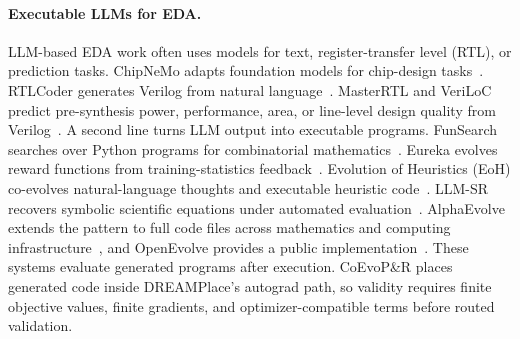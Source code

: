 \paragraph{Executable LLMs for EDA.}
LLM-based EDA work often uses models for text, register-transfer level (RTL),
or prediction tasks. ChipNeMo adapts foundation models for chip-design
tasks~\cite{chipnemo}. RTLCoder generates Verilog from natural
language~\cite{rtlcoder}. MasterRTL and VeriLoC predict pre-synthesis power,
performance, area, or line-level design quality from
Verilog~\cite{masterrtl,veriloc}. A second line turns LLM output into
executable programs. FunSearch searches over Python programs for
combinatorial mathematics~\cite{funsearch}. Eureka evolves reward functions
from training-statistics feedback~\cite{eureka}. Evolution of Heuristics
(EoH) co-evolves natural-language thoughts and executable heuristic
code~\cite{eoh}. LLM-SR recovers symbolic scientific equations under
automated evaluation~\cite{llmsr}. AlphaEvolve extends the pattern to full
code files across mathematics and computing infrastructure~\cite{alphaevolve},
and OpenEvolve provides a public implementation~\cite{openevolve}. These
systems evaluate generated programs after execution. CoEvoP\&R places
generated code inside DREAMPlace's autograd path, so validity requires finite
objective values, finite gradients, and optimizer-compatible terms before
routed validation.
